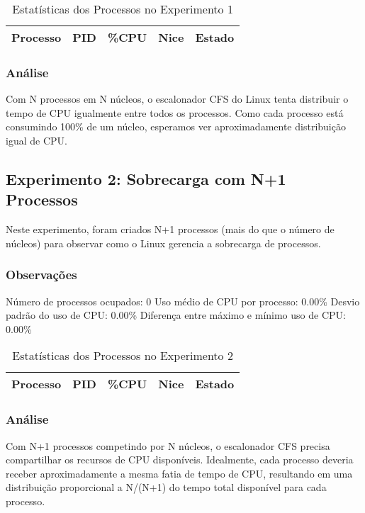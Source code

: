 \documentclass{article}
\begin{document}
\begin{table}[H]
\centering
\caption{Estatísticas dos Processos no Experimento 1}
\begin{tabular}{lrrrc}
\toprule
\textbf{Processo} & \textbf{PID} & \textbf{\%CPU} & \textbf{Nice} & \textbf{Estado} \\
\midrule
\bottomrule
\end{tabular}
\end{table}

\subsubsection{Análise}
Com N processos em N núcleos, o escalonador CFS do Linux tenta distribuir o tempo de CPU igualmente entre todos os processos.
Como cada processo está consumindo 100\% de um núcleo, esperamos ver aproximadamente distribuição igual de CPU.
\subsection{Experimento 2: Sobrecarga com N+1 Processos}
Neste experimento, foram criados N+1 processos (mais do que o número de núcleos) 
para observar como o Linux gerencia a sobrecarga de processos.

\subsubsection{Observações}

Número de processos ocupados: 0
Uso médio de CPU por processo: 0.00\%
Desvio padrão do uso de CPU: 0.00\%
Diferença entre máximo e mínimo uso de CPU: 0.00\%


\begin{table}[H]
\centering
\caption{Estatísticas dos Processos no Experimento 2}
\begin{tabular}{lrrrc}
\toprule
\textbf{Processo} & \textbf{PID} & \textbf{\%CPU} & \textbf{Nice} & \textbf{Estado} \\
\midrule
\bottomrule
\end{tabular}
\end{table}

\subsubsection{Análise}
Com N+1 processos competindo por N núcleos, o escalonador CFS precisa compartilhar os recursos de CPU disponíveis.
Idealmente, cada processo deveria receber aproximadamente a mesma fatia de tempo de CPU, resultando em uma distribuição
proporcional a N/(N+1) do tempo total disponível para cada processo.
\end{document}
